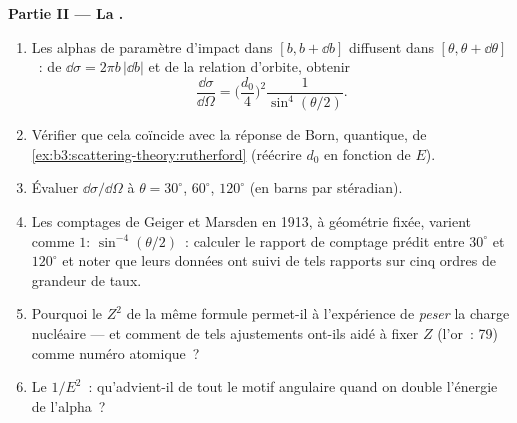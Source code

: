 \begin{problem}
\medskip\noindent\textbf{Partie II --- La .}
\begin{enumerate}[resume]
  \item Les alphas de paramètre d'impact dans $[b, b + \dd b]$
        diffusent dans $[\theta, \theta + \dd\theta]$~: de $\dd\sigma =
        2\pi b\,|\dd b|$ et de la relation d'orbite, obtenir
        \[
        \frac{\dd\sigma}{\dd\Omega} =
        \Big(\frac{d_0}{4}\Big)^2\frac{1}{\sin^4(\theta/2)} .
        \]
  \item Vérifier que cela coïncide avec la réponse de Born, quantique,
        de \cref{ex:b3:scattering-theory:rutherford} (réécrire $d_0$
        en fonction de $E$).
  \item Évaluer $\dd\sigma/\dd\Omega$ à $\theta = 30^\circ$,
        $60^\circ$, $120^\circ$ (en barns par stéradian).
  \item Les comptages de Geiger et Marsden en 1913, à géométrie fixée,
        varient comme $1{:}\,\sin^{-4}(\theta/2)$~: calculer le
        rapport de comptage prédit entre $30^\circ$ et $120^\circ$ et
        noter que leurs données ont suivi de tels rapports sur cinq
        ordres de grandeur de taux.
  \item Pourquoi le $Z^2$ de la même formule permet-il à l'expérience
        de \emph{peser} la charge nucléaire --- et comment de tels
        ajustements ont-ils aidé à fixer $Z$ (l'or~: 79) comme numéro
        atomique~?
  \item Le $1/E^2$~: qu'advient-il de tout le motif angulaire quand on
        double l'énergie de l'alpha~?
\end{enumerate}


\end{problem}
